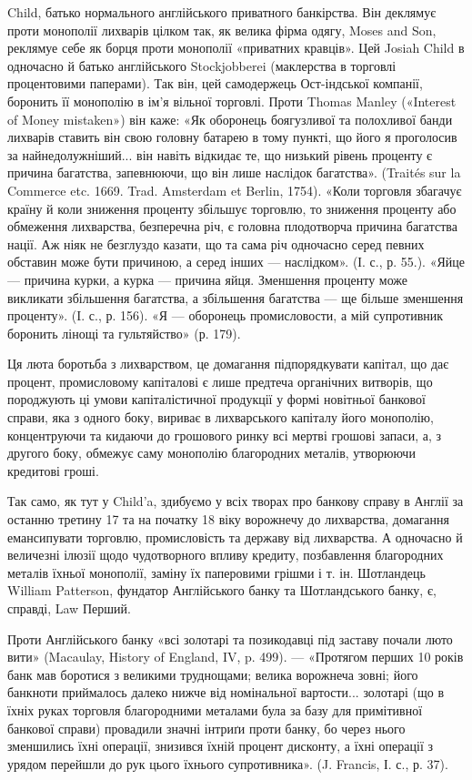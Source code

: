 \parcont{}  %
Child, батько нормального англійського приватного банкірства. Він деклямує
проти монополії лихварів цілком так, як велика фірма одягу, Moses and Son,
реклямуе себе як борця проти монополії «приватних кравців». Цей Josiah Child
в одночасно й батько англійського Stockjobberei (маклерства в торговлі процентовими
паперами). Так він, цей самодержець Ост-індської компанії, боронить її
монополію в ім’я вільної торговлі. Проти Thomas Manley («Interest of Money
mistaken») він каже: «Як оборонець боягузливої та полохливої банди лихварів
ставить він свою головну батарею в тому пункті, що його я проголосив за
найнедолужніший... він навіть відкидає те, що низький рівень проценту є причина
багатства, запевнюючи, що він лише наслідок багатства». (Traités sur la
Commerce etc. 1669. Trad. Amsterdam et Berlin, 1754). «Коли торговля збагачує
країну й коли зниження проценту збільшує торговлю, то зниження проценту
або обмеження лихварства, безперечна річ, є головна плодотворча причина багатства
нації. Аж ніяк не безглуздо казати, що та сама річ одночасно серед певних
обставин може бути причиною, а серед інших — наслідком». (І. с., р. 55.). «Яйце —
причина курки, а курка — причина яйця. Зменшення проценту може викликати
збільшення багатства, а збільшення багатства — ще більше зменшення проценту».
(I. с., р. 156). «Я — оборонець промисловости, а мій супротивник боронить
лінощі та гультяйство» (р. 179).

Ця люта боротьба з лихварством, це домагання підпорядкувати капітал, що
дає процент, промисловому капіталові є лише предтеча органічних витворів, що
породжують ці умови капіталістичної продукції у формі новітньої банкової справи,
яка з одного боку, вириває в лихварського капіталу його монополію, концентруючи
та кидаючи до грошового ринку всі мертві грошові запаси, а, з другого
боку, обмежує саму монополію благородних металів, утворюючи кредитові гроші.

Так само, як тут у Child’a, здибуємо у всіх творах про банкову справу
в Англії за останню третину 17 та на початку 18 віку ворожнечу до лихварства,
домагання емансипувати торговлю, промисловість та державу від лихварства.
А одночасно й величезні ілюзії щодо чудотворного впливу кредиту, позбавлення
благородних металів їхньої монополії, заміну їх паперовими грішми
і т. ін. Шотландець William Patterson, фундатор Англійського банку та Шотландського
банку, є, справді, Law Перший.

Проти Англійського банку «всі золотарі та позикодавці під заставу почали
люто вити» (Macaulay, History of England, IV, p. 499). — «Протягом перших
10 років банк мав боротися з великими труднощами; велика ворожнеча
зовні; його банкноти приймалось далеко нижче від номінальної вартости... золотарі
(що в їхніх руках торговля благородними металами була за базу для
примітивної банкової справи) провадили значні інтриґи проти банку, бо через
нього зменшились їхні операції, знизився їхній процент дисконту, а їхні
операції з урядом перейшли до рук цього їхнього супротивника». (J. Francis,
І. с., р. 37).

